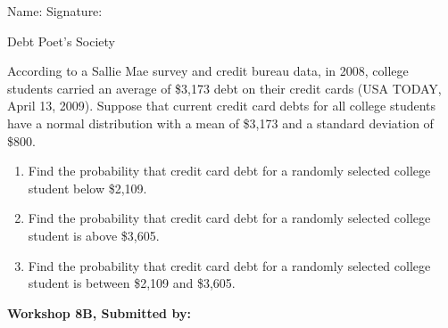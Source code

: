 \documentclass[11pt, chapterprefix=true]{scrbook}\usepackage[]{graphicx}\usepackage[]{color}
\begin{document}
\begin{exercises}
\begin{exercise}
\begin{center}
{{\vspace{4mm}
Name: \underline{\phantom{xxxxxxxxxxxxxxxxxxxxxxxx}} Signature: \underline{\phantom{xxxxxxxxxxxxxxxxxxxxxxxx}}
 }}
\end{center}

Debt Poet's Society

According to a Sallie Mae survey and credit bureau data, in 2008, college students carried an average of \$3,173 debt on their credit cards (USA TODAY, April 13, 2009). Suppose that current credit card debts for all college students have a normal distribution with a mean of \$3,173 and a standard deviation of \$800. 

\begin{enumerate}
  \item Find the probability that credit card debt for a randomly selected college student below \$2,109.
  \item Find the probability that credit card debt for a randomly selected college student is above \$3,605.
  \item Find the probability that credit card debt for a randomly selected college student is between \$2,109 and \$3,605.
\end{enumerate}

\end{exercise} 
\begin{solution}  %

\end{solution}

\clearpage

    \begin{exercise}  %

    \begin{center}
\begin{flushleft}\textbf{\large \hfill Workshop 8B, Submitted by: }\end{flushleft}

\end{center}
\end{exercise}
\end{exercises}
\end{document}
